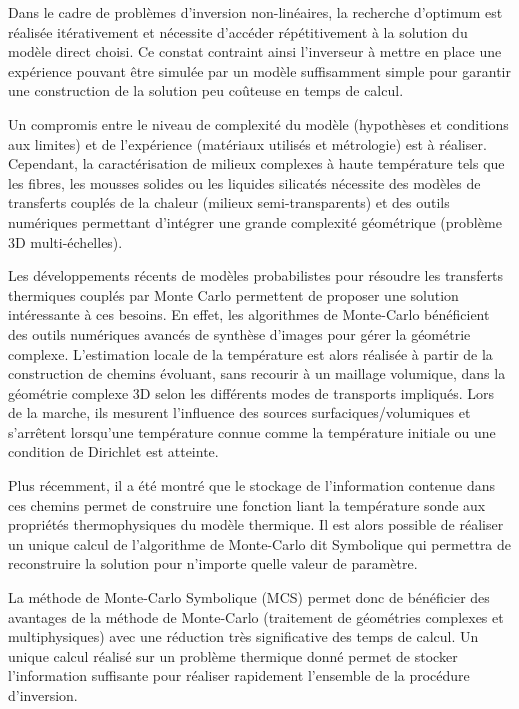 {\small
Dans le cadre de problèmes d'inversion non-linéaires, la recherche d'optimum est réalisée itérativement et nécessite d'accéder répétitivement à la solution du modèle direct choisi. Ce constat contraint ainsi l'inverseur à mettre en place une expérience pouvant être simulée par un modèle suffisamment simple pour garantir une construction de la solution peu coûteuse en temps de calcul. 



Un compromis entre le niveau de complexité du modèle (hypothèses et conditions aux limites) et de l'expérience (matériaux utilisés et métrologie) est à réaliser. Cependant, la caractérisation de milieux complexes à haute température tels que les fibres, les mousses solides ou les liquides silicatés nécessite des modèles de transferts couplés de la chaleur (milieux semi-transparents) et des outils numériques permettant d'intégrer une grande complexité géométrique (problème 3D multi-échelles).



Les développements récents de modèles probabilistes pour résoudre les transferts thermiques couplés par Monte Carlo permettent de proposer une solution intéressante à ces besoins. En effet, les algorithmes de Monte-Carlo bénéficient des outils numériques avancés de synthèse d'images pour gérer la géométrie complexe. L'estimation locale de la température est alors réalisée à partir de la construction de chemins évoluant, sans recourir à un maillage volumique, dans la géométrie complexe 3D selon les différents modes de transports impliqués. Lors de la marche, ils mesurent l'influence des sources surfaciques/volumiques et s'arrêtent lorsqu'une température connue comme la température initiale ou une condition de Dirichlet est atteinte. 



Plus récemment, il a été montré que le stockage de l'information contenue dans ces chemins permet de construire une fonction liant la température sonde aux propriétés thermophysiques du modèle thermique. Il est alors possible de réaliser un unique calcul de l'algorithme de Monte-Carlo dit Symbolique qui permettra de reconstruire la solution pour n'importe quelle valeur de paramètre.



La méthode de Monte-Carlo Symbolique (MCS) permet donc de bénéficier des avantages de la méthode de Monte-Carlo (traitement de géométries complexes et multiphysiques) avec une réduction très significative des temps de calcul. Un unique calcul réalisé sur un problème thermique donné permet de stocker l'information suffisante pour réaliser rapidement l'ensemble de la procédure d'inversion. 



}
